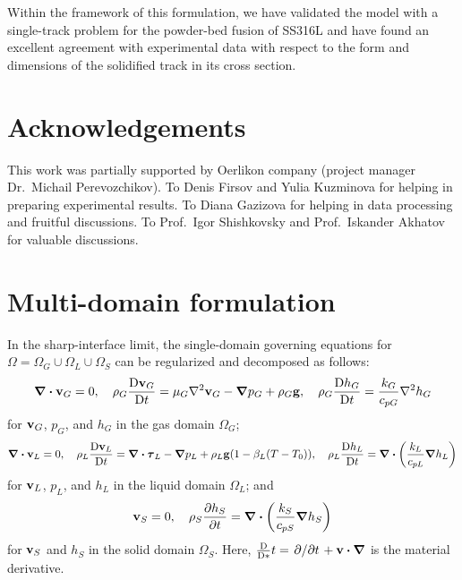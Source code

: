 \documentclass{article}
\newcommand\Dv[2][]{\frac{\mathrm{D}#1}{\mathrm{D}#2}}
\newcommand{\bv}{\vb{v}}
\newcommand{\btau}{\vb*\tau}
\begin{document}
Within the framework of this formulation, we have validated the model with a single-track problem
for the powder-bed fusion of SS316L and have found an excellent agreement with experimental data
with respect to the form and dimensions of the solidified track in its cross section.

\section{Acknowledgements}
This work was partially supported by Oerlikon company (project manager Dr.~Michail Perevozchikov).
To Denis Firsov and Yulia Kuzminova for helping in preparing experimental results.
To Diana Gazizova for helping in data processing and fruitful discussions.
To Prof.~Igor Shishkovsky and Prof.~Iskander Akhatov for valuable discussions.

\appendix

\section{Multi-domain formulation}\label{sec:multi-domain}

In the sharp-interface limit, the single-domain governing equations for $\Omega=\Omega_G\cup\Omega_L\cup\Omega_S$ can be regularized and decomposed as follows:
\begin{equation}
    \div\bv_G = 0, \quad
    \rho_G\Dv[\bv_G]{t} = \mu_G\laplacian\bv_G - \grad{p_G} + \rho_G\vb{g}, \quad
    \rho_G\Dv[h_G]{t} = \frac{k_G}{c_{pG}}\laplacian{h_G}
\end{equation}
for $\bv_G$, $p_G$, and $h_G$ in the gas domain $\Omega_G$;
\begin{equation}
    \div\bv_L = 0, \quad
    \rho_L\Dv[\bv_L]{t} = \div\btau_L - \grad{p_L} + \rho_L\vb{g}(1-\beta_L(T-T_0)), \quad
    \rho_L\Dv[h_L]{t} = \div(\frac{k_L}{c_{pL}}\grad{h_L})
\end{equation}
for $\bv_L$, $p_L$, and $h_L$ in the liquid domain $\Omega_L$; and
\begin{equation}
    \bv_S = 0, \quad \rho_S\pdv{h_S}{t} = \div(\frac{k_S}{c_{pS}}\grad{h_S})
\end{equation}
for $\bv_S$ and $h_S$ in the solid domain $\Omega_S$.
Here, $\Dv*{t} = \pdv*{t} + \bv\vdot\grad$ is the material derivative.
\end{document}
